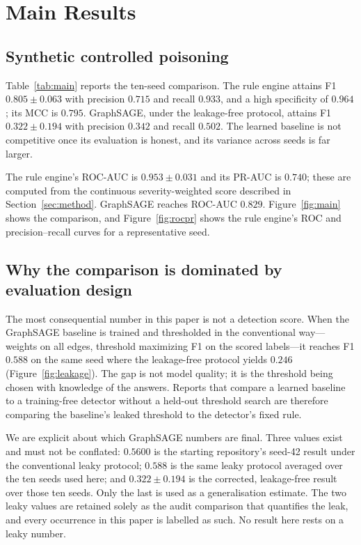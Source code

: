 \documentclass[conference]{IEEEtran}
\begin{document}
\section{Main Results}
\label{sec:results}
\subsection{Synthetic controlled poisoning}
Table~\ref{tab:main} reports the ten-seed comparison. The rule engine attains F1
$0.805\pm0.063$ with precision $0.715$ and recall $0.933$, and a high specificity
of $0.964$; its MCC is $0.795$. GraphSAGE, under the leakage-free protocol,
attains F1 $0.322\pm0.194$ with precision $0.342$ and recall $0.502$. The learned
baseline is not competitive once its evaluation is honest, and its variance
across seeds is far larger.

The rule engine's ROC-AUC is $0.953\pm0.031$ and its PR-AUC is $0.740$; these are
computed from the continuous severity-weighted score described in
Section~\ref{sec:method}. GraphSAGE reaches ROC-AUC $0.829$. Figure~\ref{fig:main}
shows the comparison, and Figure~\ref{fig:rocpr} shows the rule engine's ROC and
precision--recall curves for a representative seed.

\subsection{Why the comparison is dominated by evaluation design}
The most consequential number in this paper is not a detection score. When the
GraphSAGE baseline is trained and thresholded in the conventional way---weights
on all edges, threshold maximizing F1 on the scored labels---it reaches F1
$0.588$ on the same seed where the leakage-free protocol yields $0.246$
(Figure~\ref{fig:leakage}). The gap is not model quality; it is the threshold
being chosen with knowledge of the answers. Reports that compare a learned
baseline to a training-free detector without a held-out threshold search are
therefore comparing the baseline's leaked threshold to the detector's fixed
rule.

We are explicit about which GraphSAGE numbers are final. Three values exist and
must not be conflated: $0.5600$ is the starting repository's seed-42 result under
the conventional leaky protocol; $0.588$ is the same leaky protocol averaged over
the ten seeds used here; and $0.322\pm0.194$ is the corrected, leakage-free
result over those ten seeds. Only the last is used as a generalisation estimate.
The two leaky values are retained solely as the audit comparison that quantifies
the leak, and every occurrence in this paper is labelled as such. No result here
rests on a leaky number.
\end{document}
